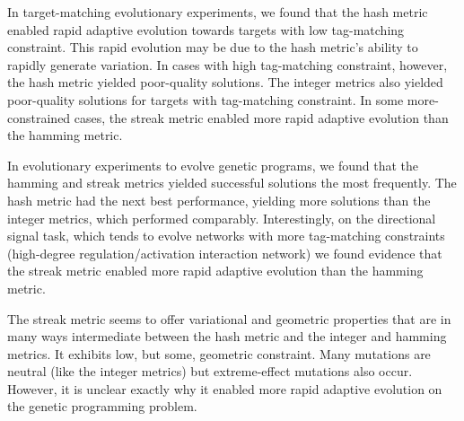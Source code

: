 In target-matching evolutionary experiments, we found that the hash metric enabled rapid adaptive evolution towards targets with low tag-matching constraint.
This rapid evolution may be due to the hash metric's ability to rapidly generate variation.
In cases with high tag-matching constraint, however, the hash metric yielded poor-quality solutions.
The integer metrics also yielded poor-quality solutions for targets with tag-matching constraint.
In some more-constrained cases, the streak metric enabled more rapid adaptive evolution than the hamming metric.

In evolutionary experiments to evolve genetic programs, we found that the hamming and streak metrics yielded successful solutions the most frequently.
The hash metric had the next best performance, yielding more solutions than the integer metrics, which performed comparably.
Interestingly, on the directional signal task, which tends to evolve networks with more tag-matching constraints (high-degree regulation/activation interaction network) we found evidence that the streak metric enabled more rapid adaptive evolution than the hamming metric.

The streak metric seems to offer variational and geometric properties that are in many ways intermediate between the hash metric and the integer and hamming metrics.
It exhibits low, but some, geometric constraint.
Many mutations are neutral (like the integer metrics) but extreme-effect mutations also occur.
However, it is unclear exactly why it enabled more rapid adaptive evolution on the genetic programming problem.



